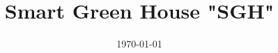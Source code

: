 \documentclass[a4paper, 11pt, oneside]{Thesis}  %
\begin{document}
\renewcommand{\contentsname}{Indice}
\renewcommand{\partname}{Parte}
\renewcommand{\chaptername}{Cap\'itulo}
\renewcommand{\appendixname}{Ap\'endice}
\renewcommand{\bibname}{Bibliograf\'ia}
\renewcommand{\figurename}{Figura}
\renewcommand{\listfigurename}{Indice de figuras}
\renewcommand{\tablename}{Tabla}
\renewcommand{\listtablename}{Indice de tablas}


\frontmatter      %

\title  {Smart Green House "SGH"}
\addresses  {\groupname\\\deptname\\\univname}  %
\date       {\today}
\subject    {}
\keywords   {}

\maketitle


\fancyhead{}  %
\rhead{\thepage}  %
\lhead{}  %

\pagestyle{fancy}  %
\end{document}
